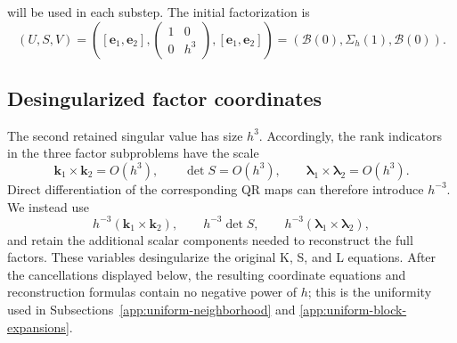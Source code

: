 \documentclass[]{article}
\numberwithin{equation}{section}
\theoremstyle{plain}
\theoremstyle{remark}
\begin{document}
will be used in each substep.  The
initial factorization is
\begin{equation}\label{eq:factor-start}
 (U,S,V)=\left(
 [\boldsymbol e_1,\boldsymbol e_2],
 \begin{pmatrix}1&0\\0&h^3\end{pmatrix},
 [\boldsymbol e_1,\boldsymbol e_2]\right)
 =(\mathcal B(0),\Sigma_h(1),\mathcal B(0)).
\end{equation}

\subsection{Desingularized factor coordinates}
\label{app:desingularized-factor-coordinates}

The second retained singular value has size \(h^3\).  Accordingly,
the rank indicators in the three factor subproblems have the scale
\[
 \boldsymbol k_1\times\boldsymbol k_2=O(h^3),
 \qquad
 \det S=O(h^3),
 \qquad
 \boldsymbol\lambda_1\times\boldsymbol\lambda_2=O(h^3).
\]
Direct differentiation of the corresponding QR maps can therefore
introduce \(h^{-3}\).  We instead use
\[
 h^{-3}(\boldsymbol k_1\times\boldsymbol k_2),
 \qquad
 h^{-3}\det S,
 \qquad
 h^{-3}(\boldsymbol\lambda_1\times\boldsymbol\lambda_2),
\]
and retain the additional scalar components needed to reconstruct the
full factors.  These variables desingularize the original K, S, and L
equations.  After the cancellations displayed below, the resulting
coordinate equations and reconstruction formulas contain no negative
power of \(h\); this is the uniformity used in
Subsections~\ref{app:uniform-neighborhood} and
\ref{app:uniform-block-expansions}.
\end{document}
